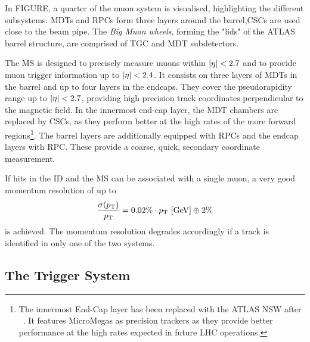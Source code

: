 In FIGURE, a quarter of the muon system is visualised, highlighting the different subsystems. \acp{MDT} and \acp{RPC} form three layers around the barrel,\acp{CSC} are used close to the beam pipe. The \textit{Big Muon wheels}, forming the "lids" of the \ac{ATLAS} barrel structure, are comprised of \ac{TGC} and \ac{MDT} subdetectors.

The \ac{MS} is designed to precisely measure muons within \(|\eta|<2.7\) and to provide muon trigger information up to \(|\eta|<2.4\). It consists on three layers of \acp{MDT} in the barrel and up to four layers in the endcaps. They cover the pseudorapidity range up to $|\eta| < 2.7$, providing high precision track coordinates perpendicular to the magnetic field.
In the innermost end-cap layer, the \ac{MDT} chambers are replaced by \acp{CSC}, as they perform better at the high rates of the more forward regions\footnote{The innermost End-Cap layer has been replaced with the \ac{ATLAS} \ac{NSW} after \RunTwo~\cite{NSW}. It features MicroMegas as precision trackers as they provide better performance at the high rates expected in future LHC operations.}.
The barrel layers are additionally equipped with \acp{RPC} and the endcap layers with \ac{RPC}. These provide a coarse, quick, secondary coordinate measurement.

If hits in the \ac{ID} and the \ac{MS} can be associated with a single muon, a very good momentum resolution of up to
\begin{equation}
    \frac{\sigma(p_{\text{T}})}{p_{\text{T}}} = 
    0.02\% \cdot p_{\text{T}}~[\text{GeV}] \oplus 2\%
\end{equation}
is achieved. The momentum resolution degrades accordingly if a track is identified in only one of the two systems.






\subsection{The Trigger System}



